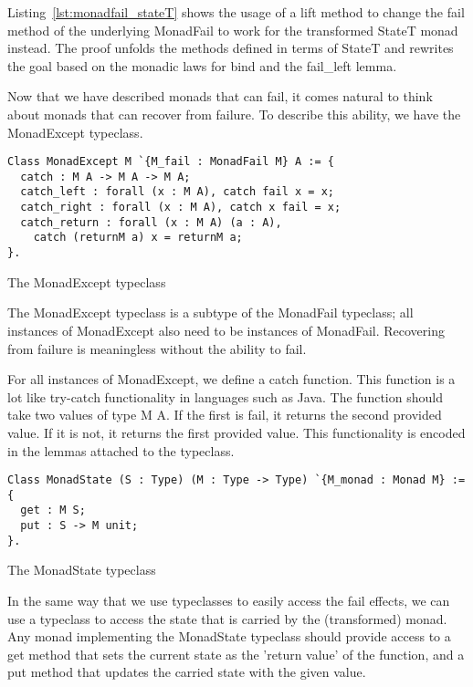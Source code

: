 Listing~\ref{lst:monadfail_stateT} shows the usage of a lift method to change
the fail method of the underlying MonadFail to work for the transformed StateT
monad instead. The proof unfolds the methods defined in terms of StateT and
rewrites the goal based on the monadic laws for bind and the fail\_left lemma.

Now that we have described monads that can fail, it comes natural to think
about monads that can recover from failure. To describe this ability, we have
the MonadExcept typeclass.

\begin{listing}
\begin{verbatim}
Class MonadExcept M `{M_fail : MonadFail M} A := {
  catch : M A -> M A -> M A;
  catch_left : forall (x : M A), catch fail x = x;
  catch_right : forall (x : M A), catch x fail = x;
  catch_return : forall (x : M A) (a : A),
    catch (returnM a) x = returnM a;
}.
\end{verbatim}
\caption{The MonadExcept typeclass}
\label{lst:monadexcept}
\end{listing}

The MonadExcept typeclass is a subtype of the MonadFail typeclass; all
instances of MonadExcept also need to be instances of MonadFail. Recovering
from failure is meaningless without the ability to fail.

For all instances of MonadExcept, we define a catch function. This function
is a lot like try-catch functionality in languages such as Java. The function
should take two values of type M A. If the first is fail, it returns the
second provided value. If it is not, it returns the first provided value. This
functionality is encoded in the lemmas attached to the typeclass.

\begin{listing}
\begin{verbatim}
Class MonadState (S : Type) (M : Type -> Type) `{M_monad : Monad M} :=
{
  get : M S;
  put : S -> M unit;
}.
\end{verbatim}
\caption{The MonadState typeclass}
\label{lst:monadstate}
\end{listing}

In the same way that we use typeclasses to easily access the fail effects, we 
can use a typeclass to access the state that is carried by the (transformed)
monad. Any monad implementing the MonadState typeclass should provide access to
a get method that sets the current state as the 'return value' of the function,
and a put method that updates the carried state with the given value.

